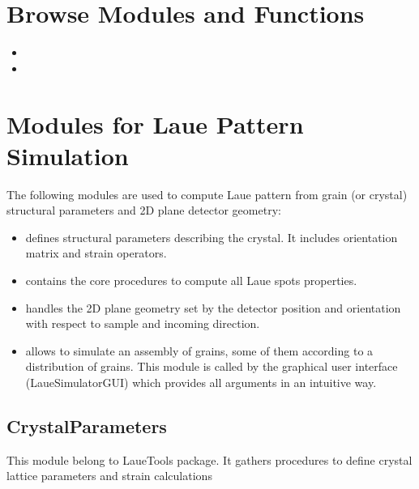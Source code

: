 \documentclass[letterpaper,10pt,english]{sphinxmanual}
\begin{document}
\section{Browse Modules and Functions}
\label{\detokenize{LaueToolsModules:browse-modules-and-functions}}\begin{itemize}
\item {} 

\item {} 

\end{itemize}


\section{Modules for Laue Pattern Simulation}
\label{\detokenize{LaueToolsModules:modules-for-laue-pattern-simulation}}
The following modules are used to compute Laue pattern from grain (or crystal) structural parameters and 2D plane detector geometry:
\begin{itemize}
\item {} 
 defines structural parameters describing the crystal. It includes orientation matrix and strain operators.

\item {} 
 contains the core procedures to compute all Laue spots properties.

\item {} 
 handles the 2D plane geometry set by the detector position and orientation with respect to sample and incoming direction.

\item {} 
 allows to simulate an assembly of grains, some of them according to a distribution of grains. This module is called by the graphical user interface (LaueSimulatorGUI) which provides all arguments in an intuitive way.

\end{itemize}


\subsection{CrystalParameters}
\label{\detokenize{Simulation_Module::doc}}\label{\detokenize{Simulation_Module:crystalparameters}}\label{\detokenize{Simulation_Module:simulation}}\label{\detokenize{Simulation_Module:module-LaueTools.CrystalParameters}}
This module belong to LaueTools package. It gathers procedures to define crystal
lattice parameters and strain calculations
\end{document}
